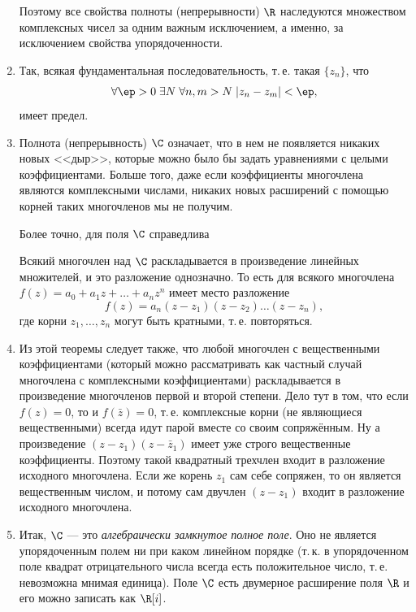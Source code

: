 \begin{enumerate}
Поэтому все свойства полноты (непрерывности) $\R$ наследуются множеством комплексных чисел за одним важным исключением, а именно, за исключением свойства упорядоченности.
\item Так, всякая фундаментальная последовательность, т.\,е. такая $\{z_n\}$, что
$$
\forall\ep>0\;\exists N\;\forall n,m>N\;|z_n-z_m|<\ep,
$$
имеет предел.
\item Полнота (непрерывность) $\C$ означает, что в нем не появляется никаких новых <<дыр>>, которые можно было бы задать уравнениями с целыми коэффициентами. Больше того, даже если коэффициенты многочлена являются комплексными числами, никаких новых расширений с помощью корней таких многочленов мы не получим.

Более точно, для поля $\C$ справедлива
\begin{thrm}
Всякий многочлен над $\C$ раскладывается в произведение линейных множителей, и это разложение однозначно. То есть для всякого многочлена $f(z)=a_0+a_1z+\dots+a_nz^n$ имеет место разложение
$$
f(z)=a_n(z-z_1)(z-z_2)\dots(z-z_n),
$$
где корни $z_1,\dots,z_n$ могут быть кратными, т.\,е. повторяться.
\end{thrm}
\item Из этой теоремы следует также, что любой многочлен с вещественными коэффициентами (который можно рассматривать как частный случай многочлена с комплексными коэффициентами) раскладывается в произведение многочленов первой и второй степени. Дело тут в том, что если $f(z)=0$, то и $f(\bar z)=0$, т.\,е. комплексные корни (не являющиеся вещественными) всегда идут парой вместе со своим сопряжённым. Ну а произведение $(z-z_1)(z-\bar z_1)$ имеет уже строго вещественные коэффициенты. Поэтому такой квадратный трехчлен входит в разложение исходного многочлена. Если же корень $z_1$ сам себе сопряжен, то он является вещественным числом, и потому сам двучлен $(z-z_1)$ входит в разложение исходного многочлена.
\item Итак, $\C$ --- это \textit{алгебраически замкнутое полное поле}. Оно не является упорядоченным полем ни при каком линейном порядке (т.\,к. в упорядоченном поле квадрат отрицательного числа всегда есть положительное число, т.\,е. невозможна мнимая единица). Поле $\C$ есть двумерное расширение поля $\R$ и его можно записать как $\R[i]$.





\end{enumerate}
